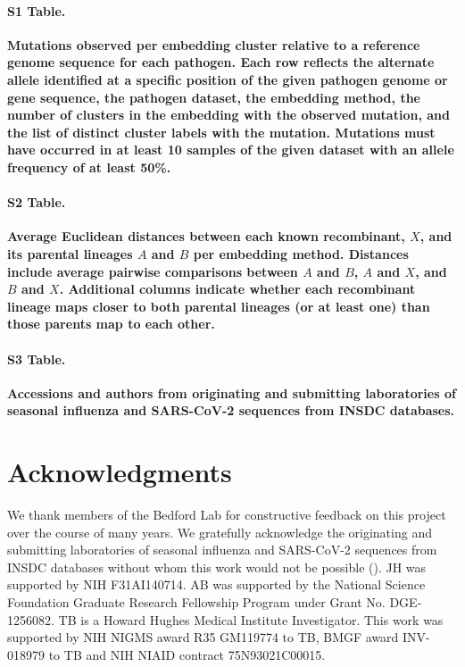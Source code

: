 \documentclass[10pt,letterpaper]{article}
\begin{document}
\paragraph*{S1 Table.}
\label{S1_Table}
{\bf Mutations observed per embedding cluster relative to a reference genome sequence for each pathogen. Each row reflects the alternate allele identified at a specific position of the given pathogen genome or gene sequence, the pathogen dataset, the embedding method, the number of clusters in the embedding with the observed mutation, and the list of distinct cluster labels with the mutation. Mutations must have occurred in at least 10 samples of the given dataset with an allele frequency of at least 50\%.}

\paragraph*{S2 Table.}
\label{S2_Table}
{\bf Average Euclidean distances between each known recombinant, $X$, and its parental lineages $A$ and $B$ per embedding method. Distances include average pairwise comparisons between $A$ and $B$, $A$ and $X$, and $B$ and $X$. Additional columns indicate whether each recombinant lineage maps closer to both parental lineages (or at least one) than those parents map to each other.}

\paragraph*{S3 Table.}
\label{S3_Table}
{\bf Accessions and authors from originating and submitting laboratories of seasonal influenza and SARS-CoV-2 sequences from INSDC databases.}

\section*{Acknowledgments}

We thank members of the Bedford Lab for constructive feedback on this project over the course of many years.
We gratefully acknowledge the originating and submitting laboratories of seasonal influenza and SARS-CoV-2 sequences from INSDC databases without whom this work would not be possible ().
JH was supported by NIH F31AI140714.
AB was supported by the National Science Foundation Graduate Research Fellowship Program under Grant No.
DGE-1256082.
TB is a Howard Hughes Medical Institute Investigator.
This work was supported by NIH NIGMS award R35 GM119774 to TB, BMGF award INV-018979 to TB and NIH NIAID contract 75N93021C00015.
\end{document}
